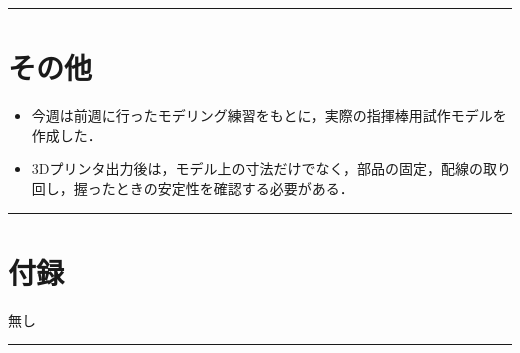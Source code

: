 \documentclass[uplatex,dvipdfmx,a4paper,11pt]{jsarticle}
\newcommand{\sectionrule}{\par\medskip\noindent\rule{\linewidth}{0.6pt}\par\medskip}
\begin{document}
\sectionrule

\section{その他}

\begin{itemize}
  \item 今週は前週に行ったモデリング練習をもとに，実際の指揮棒用試作モデルを作成した．
  \item 3Dプリンタ出力後は，モデル上の寸法だけでなく，部品の固定，配線の取り回し，握ったときの安定性を確認する必要がある．
\end{itemize}

\sectionrule

\section{付録}

無し

\sectionrule
\end{document}

